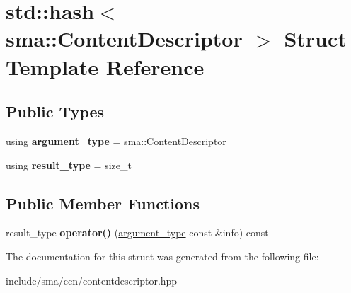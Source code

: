 \hypertarget{structstd_1_1hash_3_01sma_1_1ContentDescriptor_01_4}{\section{std\-:\-:hash$<$ sma\-:\-:Content\-Descriptor $>$ Struct Template Reference}
\label{structstd_1_1hash_3_01sma_1_1ContentDescriptor_01_4}
}
\subsection*{Public Types}
\begin{DoxyCompactItemize}
\item 
\hypertarget{structstd_1_1hash_3_01sma_1_1ContentDescriptor_01_4_ac4bb043ede97817f9d8b79ab54a60fdc}{using {\bfseries argument\-\_\-type} = \hyperlink{structsma_1_1ContentDescriptor}{sma\-::\-Content\-Descriptor}}\label{structstd_1_1hash_3_01sma_1_1ContentDescriptor_01_4_ac4bb043ede97817f9d8b79ab54a60fdc}

\item 
\hypertarget{structstd_1_1hash_3_01sma_1_1ContentDescriptor_01_4_a11c2c83e5219f970274b9e409ad72a8f}{using {\bfseries result\-\_\-type} = size\-\_\-t}\label{structstd_1_1hash_3_01sma_1_1ContentDescriptor_01_4_a11c2c83e5219f970274b9e409ad72a8f}

\end{DoxyCompactItemize}
\subsection*{Public Member Functions}
\begin{DoxyCompactItemize}
\item 
\hypertarget{structstd_1_1hash_3_01sma_1_1ContentDescriptor_01_4_aa65743dc59a0ebd581e118c7768e7b4b}{result\-\_\-type {\bfseries operator()} (\hyperlink{structsma_1_1ContentDescriptor}{argument\-\_\-type} const \&info) const }\label{structstd_1_1hash_3_01sma_1_1ContentDescriptor_01_4_aa65743dc59a0ebd581e118c7768e7b4b}

\end{DoxyCompactItemize}


The documentation for this struct was generated from the following file\-:\begin{DoxyCompactItemize}
\item 
include/sma/ccn/contentdescriptor.\-hpp\end{DoxyCompactItemize}

